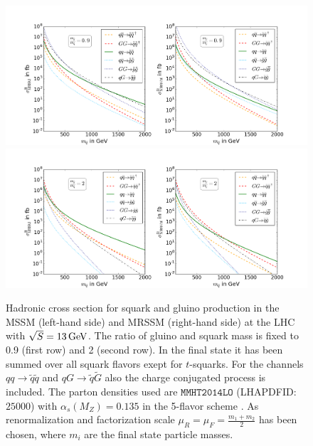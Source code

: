 \begin{figure}[!htpb]
\begin{center}
\includegraphics[scale=.4]{figures/mr=0,9_MSSM+MRSSM}
\includegraphics[scale=.4]{figures/mr=2_MSSM+MRSSM}
\caption{Hadronic cross section for squark and gluino production in the MSSM (left-hand side) and MRSSM (right-hand side) at the LHC with $\sqrt{S} = \unit[13]{GeV}$. The ratio of gluino and squark mass is fixed to 0.9 (first row) and 2 (second row). In the final state it has been summed over all squark flavors exept for $t$-squarks. For the channels $qq \to \tilde{q}\tilde{q}$ and $qG \to \tilde{q}\tilde{G}$ also the charge conjugated process is included. The parton densities used are $\mathtt{MMHT2014LO}$ (LHAPDFID:$25000$) with $\alpha_s(M_Z) = 0.135$ in the 5-flavor scheme \cite{Harland-Lang:2014zoa}. As renormalization and factorization scale $\mu_R = \mu_F = \frac{m_1 + m_2}{2}$ has been chosen, where $m_i$ are the final state particle masses.} \label{fig:TreeXsection}
\end{center}
\end{figure}

